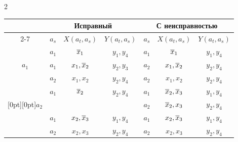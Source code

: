 \begin{multicols}{2}
\begin{table}[b]
\begin{center}
\begin{tabular}{|c|c|c|c|c|c|c|}
\hline


\multicolumn{1}{|c|}{ } &


\multicolumn{3}{c|}{Исправный} &


\multicolumn{3}{c|}{С неисправностью} \\


\cline{2-7}


\multicolumn{1}{|c|}{\raisebox{8pt}[0pt][0pt]{$a_t$}} & $a_s$ & $X(a_t,a_s)$ & $Y(a_t,a_s)$ & $a_s$ & $X(a_t,a_s)$ &


$Y(a_t,a_s)$\\


\hline


 & $a_1$ & $\overline x_1$ & $y_1,y_4$ & $a_1$ & $\overline x_1$ & $y_1,y_4$


\\




$a_1$ & $a_1$ & $x_1,\overline x_2$ & $y_2,y_3$ & $a_2$ & $x_1,\overline x_2$ & $y_2,y_4$


\\




 & $a_2$ & $x_1,x_2$ & $y_2,y_4$ & $a_2$ & $x_1,x_2$ & $y_2,y_4$


\\




\hline


 & $a_1$ & $\overline x_2$ & $y_2,y_4$ & $a_1$ & $\overline x_2,\overline x_3$& $y_1,y_4$


\\




\multicolumn{1}{|c|}{\raisebox{-6pt}[0pt][0pt]{$a_2$}} & & & & $a_2$ & $\overline x_2,x_3$ & $y_2,y_4$


\\




 & $a_1$ & $x_2,\overline x_3$ & $y_1,y_4$ & $a_1$ & $x_2,\overline x_3$ & $y_1,y_4$


\\




 & $a_2$ & $x_2,x_3$ & $y_2,y_4$ & $a_2$ & $x_2,x_3$ & $y_2,y_4$


\\


\hline


\end{tabular}


\end{center}



\end{table}
\end{multicols}
